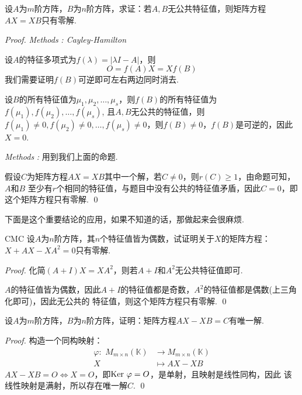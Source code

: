 \begin{proposition}
	设$A$为$m$阶方阵，$B$为$n$阶方阵，求证：若$A,B$无公共特征值，则矩阵方程$AX=XB$只有零解.
\end{proposition}

\begin{proof}
	\emph{Methods\,\,\uppercase\expandafter{}: Cayley-Hamilton}

	设$A$的特征多项式为$f(\lambda) = | \lambda I - A | $，则
	$$
		O = f(A)X = Xf(B)
	$$
	我们需要证明$f(B)$可逆即可左右两边同时消去.

	设$B$的所有特征值为$\mu_1, \mu_2, \dots, \mu_s$，则$f(B)$的所有特征值为$f(\mu_1),f(\mu_2),\dots,f(\mu_s)$,
	且$A,B$无公共的特征值，则$f(\mu_1) \neq 0, f(\mu_2) \neq 0, \dots, f(\mu_s) \neq 0$，则$f(B)\neq 0$，$f(B)$是可逆的，因此$X=0$. 
	
	\emph{Methods\,\,\uppercase\expandafter{}:}
	用到我们上面的命题.

	假设$C$为矩阵方程$AX=XB$其中一个解，若$C \neq 0$，则$r(C) \geq 1$，由命题可知，$A$和$B$
	至少有$r$个相同的特征值，与题目中没有公共的特征值矛盾，因此$C=0$，即这个矩阵方程只有零解.
	\qed{}
\end{proof}

下面是这个重要结论的应用，如果不知道的话，那做起来会很麻烦.

\begin{ex}{CMC}
	设$A$为$n$阶方阵，其$n$个特征值皆为偶数，试证明关于$X$的矩阵方程：$X+AX-XA^2=0$只有零解.
\end{ex}

\begin{proof}
	化简$(A+I)X=XA^2$，则若$A+I$和$A^2$无公共特征值即可.

	$A$的特征值皆为偶数，因此$A+I$的特征值都是奇数，$A^2$的特征值都是偶数(上三角化即可)，因此无公共的
	特征值，则这个矩阵方程只有零解. \qed{}
\end{proof}

\begin{proposition}
	设$A$为$m$阶方阵，$B$为$n$阶方阵，证明：矩阵方程$AX-XB=C$有唯一解.
\end{proposition}

\begin{proof}
	构造一个同构映射：
	\begin{align*}
		\varphi: \,\, M_{m \times n}(\mathbb{K}) &\to M_{m \times n}(\mathbb{K}) \\
			X \quad \quad  &\mapsto AX-XB
	\end{align*}
	$AX-XB=O \Longleftrightarrow X=O$，即$\text{Ker}\, \, \varphi =O$，是单射，且映射是线性同构，因此
	该线性映射是满射，所以存在唯一解$C$. 
	\qed{}

\end{proof}

